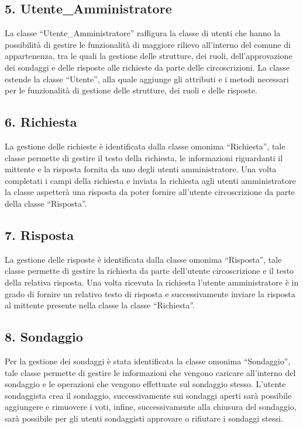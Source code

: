    \subsection*{5. Utente\_Amministratore}
        La classe ``Utente\_Amministratore'' raffigura la classe di utenti che hanno la possibilità di gestire le funzionalità di maggiore rilievo all'interno del comune di appartenenza, tra le quali la gestione delle strutture, dei ruoli, dell'approvazione dei sondaggi e delle risposte alle richieste da parte delle circoscrizioni. La classe estende la classe ``Utente'', alla quale aggiunge gli attributi e i metodi necessari per le funzionalità di gestione delle strutture, dei ruoli e delle risposte.

    \subsection*{6. Richiesta}
        La gestione delle richieste è identificata dalla classe omonima ``Richiesta'', tale classe permette di gestire il testo della richiesta, le informazioni riguardanti il mittente e la risposta fornita da uno degli utenti amministratore. Una volta completati i campi della richiesta e inviata la richiesta agli utenti amministratore la classe aspetterà una risposta da poter fornire all'utente circoscrizione da parte della classe ``Risposta''.
    
    \subsection*{7. Risposta}
        La gestione delle risposte è identificata dalla classe omonima ``Risposta'', tale classe permette di gestire la richiesta da parte dell'utente circoscrizione e il testo della relativa risposta. Una volta ricevuta la richiesta l'utente amministratore è in grado di fornire un relativo testo di risposta e successivamente inviare la risposta al mittente presente nella classe la classe ``Richiesta''.

    \subsection*{8. Sondaggio}
        Per la gestione dei sondaggi è stata identificata la classe omonima ``Sondaggio'', tale classe permette di gestire le informazioni che vengono caricare all'interno del sondaggio e le operazioni che vengono effettuate sul sondaggio stesso. L'utente sondaggista crea il sondaggio, successivamente sui sondaggi aperti sarà possibile aggiungere e rimuovere i voti, infine, successivamente alla chiusura del sondaggio, sarà possibile per gli utenti sondaggisti approvare o rifiutare i sondaggi stessi.
    
